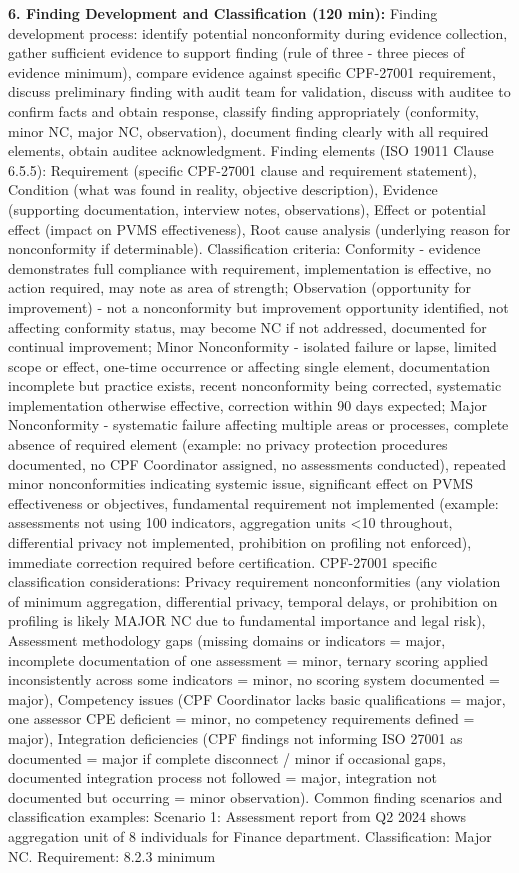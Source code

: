 \documentclass[11pt,a4paper]{article}
\begin{document}
\textbf{6. Finding Development and Classification (120 min):} Finding development process: identify potential nonconformity during evidence collection, gather sufficient evidence to support finding (rule of three - three pieces of evidence minimum), compare evidence against specific CPF-27001 requirement, discuss preliminary finding with audit team for validation, discuss with auditee to confirm facts and obtain response, classify finding appropriately (conformity, minor NC, major NC, observation), document finding clearly with all required elements, obtain auditee acknowledgment. Finding elements (ISO 19011 Clause 6.5.5): Requirement (specific CPF-27001 clause and requirement statement), Condition (what was found in reality, objective description), Evidence (supporting documentation, interview notes, observations), Effect or potential effect (impact on PVMS effectiveness), Root cause analysis (underlying reason for nonconformity if determinable). Classification criteria: Conformity - evidence demonstrates full compliance with requirement, implementation is effective, no action required, may note as area of strength; Observation (opportunity for improvement) - not a nonconformity but improvement opportunity identified, not affecting conformity status, may become NC if not addressed, documented for continual improvement; Minor Nonconformity - isolated failure or lapse, limited scope or effect, one-time occurrence or affecting single element, documentation incomplete but practice exists, recent nonconformity being corrected, systematic implementation otherwise effective, correction within 90 days expected; Major Nonconformity - systematic failure affecting multiple areas or processes, complete absence of required element (example: no privacy protection procedures documented, no CPF Coordinator assigned, no assessments conducted), repeated minor nonconformities indicating systemic issue, significant effect on PVMS effectiveness or objectives, fundamental requirement not implemented (example: assessments not using 100 indicators, aggregation units <10 throughout, differential privacy not implemented, prohibition on profiling not enforced), immediate correction required before certification. CPF-27001 specific classification considerations: Privacy requirement nonconformities (any violation of minimum aggregation, differential privacy, temporal delays, or prohibition on profiling is likely MAJOR NC due to fundamental importance and legal risk), Assessment methodology gaps (missing domains or indicators = major, incomplete documentation of one assessment = minor, ternary scoring applied inconsistently across some indicators = minor, no scoring system documented = major), Competency issues (CPF Coordinator lacks basic qualifications = major, one assessor CPE deficient = minor, no competency requirements defined = major), Integration deficiencies (CPF findings not informing ISO 27001 as documented = major if complete disconnect / minor if occasional gaps, documented integration process not followed = major, integration not documented but occurring = minor observation). Common finding scenarios and classification examples: Scenario 1: Assessment report from Q2 2024 shows aggregation unit of 8 individuals for Finance department. Classification: Major NC. Requirement: 8.2.3 minimum 
\end{document}
